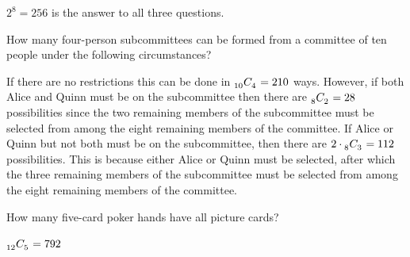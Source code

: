 \documentclass[answers,12pt]{exam}
\newcommand\ncr[2]{\tensor[_{#1}]C{_{#2}}}
\begin{document}
\begin{questions}
\begin{solution} $2^8=256$ is the answer to all three questions.\end{solution}

\question How many four-person subcommittees can be formed
from a committee of ten people under the following circumstances?
\begin{solution}
If there are no restrictions this can
be done in $\ncr{10}{4}=210$ ways.
However, if both Alice and Quinn must be on the subcommittee
then there are $\ncr{8}{2}=28$ possibilities since the two remaining
members of the subcommittee
must be selected from among the eight remaining members of the committee.
If Alice or Quinn but not both must be on the subcommittee,
then there are $2\cdot\ncr{8}{3}=112$ possibilities.
This is because either Alice or Quinn must be selected,
after which the three remaining members of the subcommittee
must be selected from among the eight remaining members of the committee.
\end{solution}

\question How many five-card poker hands have all picture cards?
\begin{solution}$\ncr{12}{5}=792$\end{solution}


\end{questions}
\end{document}
